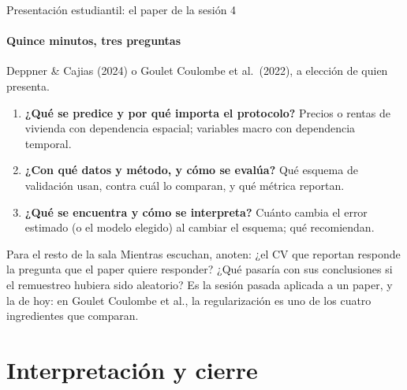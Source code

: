 \documentclass{beamer}
\newcommand{\1}{\mathbb{I}}
\begin{document}
\begin{frame}{Presentación estudiantil: el paper de la sesión 4}
\framesubtitle{Quince minutos, tres preguntas}
\small
Deppner \& Cajias (2024) o Goulet Coulombe et al.\ (2022), a elección de quien presenta.
\begin{enumerate}\itemsep5pt
  \item \textbf{¿Qué se predice y por qué importa el protocolo?} Precios o rentas de vivienda con dependencia espacial; variables macro con dependencia temporal.
  \item \textbf{¿Con qué datos y método, y cómo se evalúa?} Qué esquema de validación usan, contra cuál lo comparan, y qué métrica reportan.
  \item \textbf{¿Qué se encuentra y cómo se interpreta?} Cuánto cambia el error estimado (o el modelo elegido) al cambiar el esquema; qué recomiendan.
\end{enumerate}
\pause
\vspace{0.15cm}
\begin{block}{Para el resto de la sala}
Mientras escuchan, anoten: ¿el CV que reportan responde la pregunta que el paper quiere responder? ¿Qué pasaría con sus conclusiones si el remuestreo hubiera sido aleatorio? Es la sesión pasada aplicada a un paper, y la de hoy: en Goulet Coulombe et al., la regularización es uno de los cuatro ingredientes que comparan.
\end{block}
\end{frame}


\section{Interpretación y cierre}
\begin{frame}[noframenumbering]
\tableofcontents[currentsection]
\end{frame}
\end{document}
